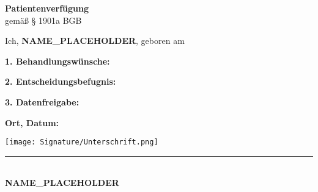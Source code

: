 \documentclass[a4paper,12pt]{article}
\begin{document}
\begin{center}
    \Large\textbf{Patientenverfügung}\\[0.3cm]
    \normalsize gemäß § 1901a BGB
\end{center}

\vspace{1cm}

Ich, \textbf{NAME_PLACEHOLDER}, geboren am %

\vspace{0.5cm}

\textbf{1. Behandlungswünsche:}


\vspace{0.5cm}

\textbf{2. Entscheidungsbefugnis:}


\vspace{0.5cm}

\textbf{3. Datenfreigabe:}


\vspace{1cm}

\textbf{Ort, Datum:} %

\vspace{1cm}

\vspace*{-0.5cm}\hspace*{0.5cm}\texttt{[image: Signature/Unterschrift.png]}\vspace*{-0.3cm}\\
\rule{6cm}{0.4pt}\\
\textbf{NAME_PLACEHOLDER}
\end{document}

